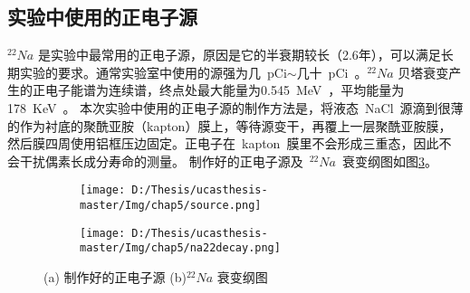  \subsection{实验中使用的正电子源}
$^{22}Na$ 是实验中最常用的正电子源，原因是它的半衰期较长（2.6年），可以满足长期实验的要求。通常实验室中使用的源强为几~pCi$\sim$几十~pCi~。$^{22}Na$ 贝塔衰变产生的正电子能谱为连续谱，终点处最大能量为0.545~MeV~，平均能量为178~KeV~。 本次实验中使用的正电子源的制作方法是，将液态~NaCl~源滴到很薄的作为衬底的聚酰亚胺（kapton）膜上，等待源变干，再覆上一层聚酰亚胺膜，然后膜四周使用铝框压边固定。正电子在~kapton~膜里不会形成三重态，因此不会干扰偶素长成分寿命的测量\citep{monge1994position}。 制作好的正电子源及~$^{22}Na$~衰变纲图如图\ref{fig:p52}。%
\begin{figure}[!htbp]
  \centering
  \begin{subfigure}[b]{\MySubFactor\textwidth}
    \texttt{[image: D:/Thesis/ucasthesis-master/Img/chap5/source.png]}
    \caption{}
    \label{fig:p52_1}
  \end{subfigure}%
  \quad\quad\quad\quad\quad\quad%
  \begin{subfigure}[b]{\MySubFactor\textwidth}
    \texttt{[image: D:/Thesis/ucasthesis-master/Img/chap5/na22decay.png]}
    \caption{}
    \label{fig:p52_2}
  \end{subfigure}
  \caption{(a) 制作好的正电子源 (b)$^{22}Na$ 衰变纲图}
  \label{fig:p52}
\end{figure}
